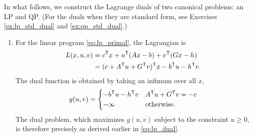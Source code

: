 \begin{Example}
In what follows, we construct the Lagrange duals of two canonical problems: an
LP and QP. (For the duals when they are standard form, see Exercises
\ref{ex:lp_std_dual} and \ref{ex:qp_std_dual}.)

\begin{enumerate}[label=\alph*., ref=\alph*]  
\item {} 
For the linear program \eqref{eq:lp_primal}, the Lagrangian is
\begin{align*}
L(x,u,v) &= c^{\mathsf{T}} x + u^{\mathsf{T}} (Ax - b) + v^{\mathsf{T}} (Gx - h) \\
&= (c + A^{\mathsf{T}} u + G^{\mathsf{T}} v)^{\mathsf{T}} x - b^{\mathsf{T}} u - h^{\mathsf{T}} v.
\end{align*}
The dual function is obtained by taking an infimum over all $x$,
\[
g(u,v) = \begin{cases}
- b^{\mathsf{T}} u - h^{\mathsf{T}} v & A^{\mathsf{T}} u + G^{\mathsf{T}} v = -c \\
- \infty & \text{otherwise}.
\end{cases}
\]
The dual problem, which maximizes $g(u,v)$ subject to the constraint $u \geq
0$, is therefore precisely as derived earlier in \eqref{eq:lp_dual}. 


\end{enumerate}
\end{Example}
